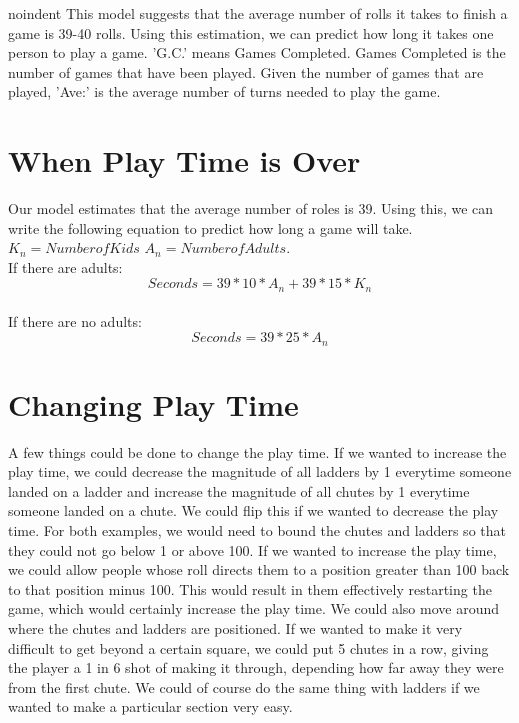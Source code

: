 \documentclass[12pt]{article} %
\begin{document}
noindent
This model suggests that the average number of rolls it takes to finish a game is 39-40 rolls. Using this estimation, we can predict how long it takes one person to play a game. 'G.C.' means Games Completed. Games Completed is the number of games that have been played. Given the number of games that are played, 'Ave:' is the average number of turns needed to play the game.

\section*{When Play Time is Over}
Our model estimates that the average number of roles is 39. Using this, we can write the following equation to predict how long a game will take. $K_{n}=Number of Kids$ $A_{n}=Number of Adults$.
\\If there are adults:
\[Seconds = 39*10*A_{n} + 39*15*K_{n}\]
\\If there are no adults:
\[Seconds = 39*25*A_{n}\]

\section*{Changing Play Time}
A few things could be done to change the play time. If we wanted to increase the play time, we could decrease the magnitude of all ladders by 1 everytime someone landed on a ladder and increase the magnitude of all chutes by 1 everytime someone landed on a chute. We could flip this if we wanted to decrease the play time. For both examples, we would need to bound the chutes and ladders so that they could not go below 1 or above 100. If we wanted to increase the play time, we could allow people whose roll directs them to a position greater than 100 back to that position minus 100. This would result in them effectively restarting the game, which would certainly increase the play time. We could also move around where the chutes and ladders are positioned. If we wanted to make it very difficult to get beyond a certain square, we could put 5 chutes in a row, giving the player a 1 in 6 shot of making it through, depending how far away they were from the first chute. We could of course do the same thing with ladders if we wanted to make a particular section very easy.
\end{document}
